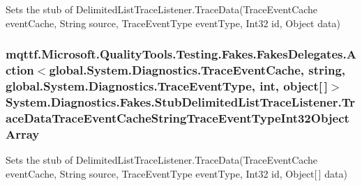 Sets the stub of Delimited\-List\-Trace\-Listener.\-Trace\-Data(\-Trace\-Event\-Cache event\-Cache, String source, Trace\-Event\-Type event\-Type, Int32 id, Object data)

\hypertarget{class_system_1_1_diagnostics_1_1_fakes_1_1_stub_delimited_list_trace_listener_a6b261f203b362239eca7dd2aa8afb8eb}{
\subsubsection[{Trace\-Data\-Trace\-Event\-Cache\-String\-Trace\-Event\-Type\-Int32\-Object\-Array}]{\setlength{\rightskip}{0pt plus 5cm}mqttf.\-Microsoft.\-Quality\-Tools.\-Testing.\-Fakes.\-Fakes\-Delegates.\-Action$<$global.\-System.\-Diagnostics.\-Trace\-Event\-Cache, string, global.\-System.\-Diagnostics.\-Trace\-Event\-Type, int, object\mbox{[}$\,$\mbox{]}$>$ System.\-Diagnostics.\-Fakes.\-Stub\-Delimited\-List\-Trace\-Listener.\-Trace\-Data\-Trace\-Event\-Cache\-String\-Trace\-Event\-Type\-Int32\-Object\-Array}}\label{class_system_1_1_diagnostics_1_1_fakes_1_1_stub_delimited_list_trace_listener_a6b261f203b362239eca7dd2aa8afb8eb}


Sets the stub of Delimited\-List\-Trace\-Listener.\-Trace\-Data(\-Trace\-Event\-Cache event\-Cache, String source, Trace\-Event\-Type event\-Type, Int32 id, Object\mbox{[}$\,$\mbox{]} data)

